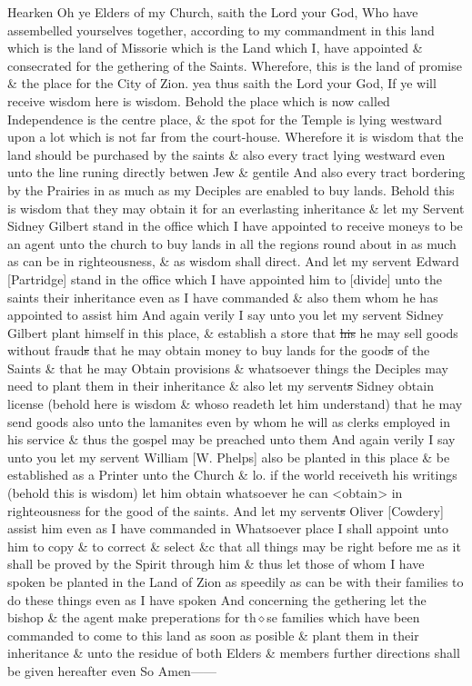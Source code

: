 				Hearken Oh ye Elders of my Church, saith the Lord your God, Who have assembelled yourselves together, according to my commandment in this land which is the land of Missorie which is the Land which I, have appointed \& consecrated for the gethering of the Saints. Wherefore, this is the land of promise \& the place for the City of Zion. yea thus saith the Lord your God, If ye will receive wisdom here is wisdom. Behold the place which is now called Independence is the centre place, \& the spot for the Temple is lying westward upon a lot which is not far from the court-house. Wherefore it is wisdom that the land should be purchased by the saints \& also every tract lying westward even unto the line runing directly betwen Jew \& gentile And also every tract bordering by the Prairies in as much as my Deciples are enabled to buy lands. Behold this is wisdom that they may obtain it for an everlasting inheritance \& let my Servent Sidney Gilbert stand in the office which I have appointed to receive moneys to be an agent unto the church to buy lands in all the regions round about in as much as can be in righteousness, \& as wisdom shall direct. And let my servent Edward [Partridge] stand in the office which I have appointed him to [divide] unto the saints their inheritance even as I have commanded \& also them whom he has appointed to assist him And again verily I say unto you let my servent Sidney Gilbert plant himself in this place, \& establish a store that \sout{his} he may sell goods without fraud\sout{s} that he may obtain money to buy lands for the good\sout{s} of the Saints \& that he may Obtain provisions \& whatsoever things the Deciples may need to plant them in their inheritance \& also let my servent\sout{s} Sidney obtain license (behold here is wisdom \& whoso readeth let him understand) that he may send goods also unto the lamanites even by whom he will as clerks employed in his service \& thus the gospel may be preached unto them And again verily I say unto you let my servent William [W. Phelps] also be planted in this place \& be established as a Printer unto the Church \& lo. if the world receiveth his writings (behold this is wisdom) let him obtain whatsoever he can <obtain> in righteousness for the good of the saints. And let my servent\sout{s} Oliver [Cowdery] assist him even as I have commanded in Whatsoever place I shall appoint unto him to copy \& to correct \& select \&c that all things may be right before me as it shall be proved by the Spirit through him \& thus let those of whom I have spoken be planted in the Land of Zion as speedily as can be with their families to do these things even as I have spoken And concerning the gethering let the bishop \& the agent make preperations for th$\diamond$se families which have been commanded to come to this land as soon as posible \& plant them in their inheritance \& unto the residue of both Elders \& members further directions shall be given hereafter even So Amen------
				
